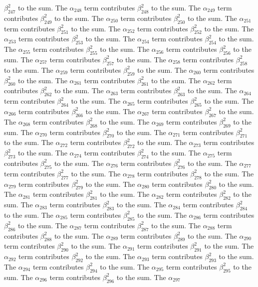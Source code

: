 \begin{lemma}
$\beta_{247}^{2}$ to the sum. The $\alpha_{248}$ term contributes $\beta_{248}^{2}$ to the sum. The $\alpha_{249}$ term contributes $\beta_{249}^{2}$ to the sum. The $\alpha_{250}$ term contributes $\beta_{250}^{2}$ to the sum. The $\alpha_{251}$ term contributes $\beta_{251}^{2}$ to the sum. The $\alpha_{252}$ term contributes $\beta_{252}^{2}$ to the sum. The $\alpha_{253}$ term contributes $\beta_{253}^{2}$ to the sum. The $\alpha_{254}$ term contributes $\beta_{254}^{2}$ to the sum. The $\alpha_{255}$ term contributes $\beta_{255}^{2}$ to the sum. The $\alpha_{256}$ term contributes $\beta_{256}^{2}$ to the sum. The $\alpha_{257}$ term contributes $\beta_{257}^{2}$ to the sum. The $\alpha_{258}$ term contributes $\beta_{258}^{2}$ to the sum. The $\alpha_{259}$ term contributes $\beta_{259}^{2}$ to the sum. The $\alpha_{260}$ term contributes $\beta_{260}^{2}$ to the sum. The $\alpha_{261}$ term contributes $\beta_{261}^{2}$ to the sum. The $\alpha_{262}$ term contributes $\beta_{262}^{2}$ to the sum. The $\alpha_{263}$ term contributes $\beta_{263}^{2}$ to the sum. The $\alpha_{264}$ term contributes $\beta_{264}^{2}$ to the sum. The $\alpha_{265}$ term contributes $\beta_{265}^{2}$ to the sum. The $\alpha_{266}$ term contributes $\beta_{266}^{2}$ to the sum. The $\alpha_{267}$ term contributes $\beta_{267}^{2}$ to the sum. The $\alpha_{268}$ term contributes $\beta_{268}^{2}$ to the sum. The $\alpha_{269}$ term contributes $\beta_{269}^{2}$ to the sum. The $\alpha_{270}$ term contributes $\beta_{270}^{2}$ to the sum. The $\alpha_{271}$ term contributes $\beta_{271}^{2}$ to the sum. The $\alpha_{272}$ term contributes $\beta_{272}^{2}$ to the sum. The $\alpha_{273}$ term contributes $\beta_{273}^{2}$ to the sum. The $\alpha_{274}$ term contributes $\beta_{274}^{2}$ to the sum. The $\alpha_{275}$ term contributes $\beta_{275}^{2}$ to the sum. The $\alpha_{276}$ term contributes $\beta_{276}^{2}$ to the sum. The $\alpha_{277}$ term contributes $\beta_{277}^{2}$ to the sum. The $\alpha_{278}$ term contributes $\beta_{278}^{2}$ to the sum. The $\alpha_{279}$ term contributes $\beta_{279}^{2}$ to the sum. The $\alpha_{280}$ term contributes $\beta_{280}^{2}$ to the sum. The $\alpha_{281}$ term contributes $\beta_{281}^{2}$ to the sum. The $\alpha_{282}$ term contributes $\beta_{282}^{2}$ to the sum. The $\alpha_{283}$ term contributes $\beta_{283}^{2}$ to the sum. The $\alpha_{284}$ term contributes $\beta_{284}^{2}$ to the sum. The $\alpha_{285}$ term contributes $\beta_{285}^{2}$ to the sum. The $\alpha_{286}$ term contributes $\beta_{286}^{2}$ to the sum. The $\alpha_{287}$ term contributes $\beta_{287}^{2}$ to the sum. The $\alpha_{288}$ term contributes $\beta_{288}^{2}$ to the sum. The $\alpha_{289}$ term contributes $\beta_{289}^{2}$ to the sum. The $\alpha_{290}$ term contributes $\beta_{290}^{2}$ to the sum. The $\alpha_{291}$ term contributes $\beta_{291}^{2}$ to the sum. The $\alpha_{292}$ term contributes $\beta_{292}^{2}$ to the sum. The $\alpha_{293}$ term contributes $\beta_{293}^{2}$ to the sum. The $\alpha_{294}$ term contributes $\beta_{294}^{2}$ to the sum. The $\alpha_{295}$ term contributes $\beta_{295}^{2}$ to the sum. The $\alpha_{296}$ term contributes $\beta_{296}^{2}$ to the sum. The $\alpha_{297}$ 
\end{lemma}
